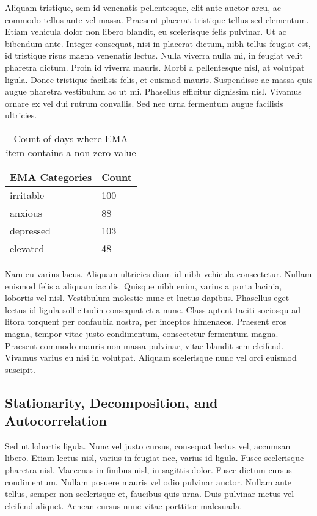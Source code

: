 \documentclass{article}
\begin{document}
Aliquam tristique, sem id venenatis pellentesque, elit ante auctor arcu,
ac commodo tellus ante vel massa. Praesent placerat tristique tellus sed
elementum. Etiam vehicula dolor non libero blandit, eu scelerisque felis
pulvinar. Ut ac bibendum ante. Integer consequat, nisi in placerat
dictum, nibh tellus feugiat est, id tristique risus magna venenatis
lectus. Nulla viverra nulla mi, in feugiat velit pharetra dictum. Proin
id viverra mauris. Morbi a pellentesque nisl, at volutpat ligula. Donec
tristique facilisis felis, et euismod mauris. Suspendisse ac massa quis
augue pharetra vestibulum ac ut mi. Phasellus efficitur dignissim nisl.
Vivamus ornare ex vel dui rutrum convallis. Sed nec urna fermentum augue
facilisis ultricies.

\begin{table}[ht]
    \centering
    \begin{tabular}{ll}
    \toprule
        \textbf{EMA Categories} & \textbf{Count} \\ \midrule
        irritable & 100 \\
        anxious & 88  \\
        depressed & 103  \\
        elevated & 48  \\
        \bottomrule
    \end{tabular}
\caption{Count of days where EMA item contains a non-zero value}
\label{EMA}
\end{table}


Nam eu varius lacus. Aliquam ultricies diam id nibh vehicula
consectetur. Nullam euismod felis a aliquam iaculis. Quisque nibh enim,
varius a porta lacinia, lobortis vel nisl. Vestibulum molestie nunc et
luctus dapibus. Phasellus eget lectus id ligula sollicitudin consequat
et a nunc. Class aptent taciti sociosqu ad litora torquent per confaubia
nostra, per inceptos himenaeos. Praesent eros magna, tempor vitae justo
condimentum, consectetur fermentum magna. Praesent commodo mauris non
massa pulvinar, vitae blandit sem eleifend. Vivamus varius eu nisi in
volutpat. Aliquam scelerisque nunc vel orci euismod suscipit.


\hypertarget{stationarity-decomposition-and-autocorrelation}{%
\subsection{Stationarity, Decomposition, and
Autocorrelation}\label{stationarity-decomposition-and-autocorrelation}}

Sed ut lobortis ligula. Nunc vel justo cursus, consequat lectus vel,
accumsan libero. Etiam lectus nisl, varius in feugiat nec, varius id
ligula. Fusce scelerisque pharetra nisl. Maecenas in finibus nisl, in
sagittis dolor. Fusce dictum cursus condimentum. Nullam posuere mauris
vel odio pulvinar auctor. Nullam ante tellus, semper non scelerisque et,
faucibus quis urna. Duis pulvinar metus vel eleifend aliquet. Aenean
cursus nunc vitae porttitor malesuada.
\end{document}
